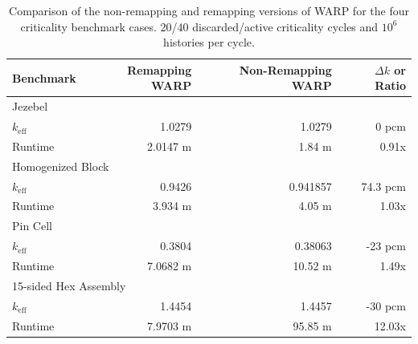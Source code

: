\begin{table}[h]
\centering
\caption{Comparison of the non-remapping and remapping versions of WARP for the four criticality benchmark cases.  20/40 discarded/active criticality cycles and $10^6$ histories per cycle.}
\label{benchmark_nonremapping_summary}
\begin{tabular}{| l | r | r | r |}
 \hline
 Benchmark & Remapping WARP & Non-Remapping WARP & $\Delta k$ or Ratio  \\
\hline
\hline
\multicolumn{4}{|l|}{Jezebel}  \\
\hline
 $k_\mathrm{eff}$ & 1.0279 & 1.0279  & 0 pcm\\
 \hline
 Runtime               &   2.0147 m & 1.84 m & 0.91x \\
 \hline
 \hline
\multicolumn{4}{|l|}{Homogenized Block }\\
\hline
 $k_\mathrm{eff}$ & 0.9426 & 0.941857 & 74.3 pcm  \\
 \hline
 Runtime               &  3.934 m & 4.05 m & 1.03x \\
 \hline
  \hline
\multicolumn{4}{|l|}{Pin Cell}\\
\hline
 $k_\mathrm{eff}$ &  0.3804 & 0.38063  & -23 pcm \\
 \hline
 Runtime               & 7.0682 m & 10.52 m & 1.49x \\
 \hline
  \hline
\multicolumn{4}{|l|}{15-sided Hex Assembly}\\
\hline
 $k_\mathrm{eff}$  & 1.4454  & 1.4457 & -30 pcm \\
 \hline
 Runtime               & 7.9703 m & 95.85 m & 12.03x \\
 \hline
\end{tabular}
\end{table}






